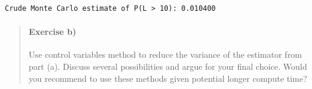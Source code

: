 \documentclass[11pt]{article}
\begin{document}
    \begin{Verbatim}[commandchars=\\\{\}]
Crude Monte Carlo estimate of P(L > 10): 0.010400
    \end{Verbatim}

    \begin{quote}
\mbox{}%
\paragraph{Exercise b)}\label{exercise-b}

Use control variables method to reduce the variance of the estimator
from part (a). Discuss several possibilities and argue for your final
choice. Would you recommend to use these methods given potential longer
compute time?
\end{quote}
\end{document}
